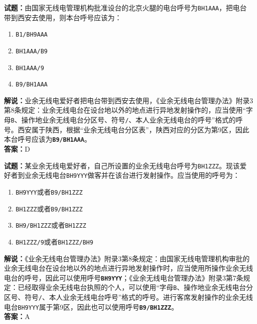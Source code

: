 \documentclass{ctexbook}
\begin{document}
\vspace{\baselineskip}

\noindent\textbf{试题：}由国家无线电管理机构批准设台的北京火腿的电台呼号为\texttt{BH1AAA}，把电台带到西安去使用，则本台呼号应该为：
\begin{enumerate}[leftmargin=3em]
  \item \texttt{B1/BH9AAA}
  \item \texttt{BH1AAA/B9}
  \item \texttt{BH1AAA/9}
  \item \texttt{B9/BH1AAA}
\end{enumerate}
\noindent\textbf{解说：}业余无线电爱好者把电台带到西安去使用，《业余无线电台管理办法》附录3第8条规定：业余无线电台在设台地以外的地点进行异地发射操作的，应当使用“字母\texttt{B}、操作地业余无线电台分区号、符号\texttt{/}、本人业余无线电台的呼号”格式的呼号。西安属于陕西，根据“业余无线电台分区表”，陕西对应的分区为第9区，因此本台呼号应该为\texttt{\textbf{B9/BH1AAA}}。\\\noindent\textbf{答案：}D

\vspace{\baselineskip}

\noindent\textbf{试题：}某业余无线电爱好者，自己所设置的业余无线电台呼号为\texttt{BH1ZZZ}。现该爱好者到业余无线电台\texttt{BH9YYY}做客并在该台进行发射操作。应当使用的呼号为：
\begin{enumerate}[leftmargin=3em]
  \item \texttt{BH9YYY}或者\texttt{B9/BH1ZZZ}
  \item \texttt{BH1ZZZ}或者\texttt{B9/BH1ZZZ}
  \item \texttt{BH9/BH1ZZZ}或者\texttt{BH1ZZZ}
  \item \texttt{BH1ZZZ/9}或者\texttt{BH1ZZZ/BH9}
\end{enumerate}
\noindent\textbf{解说：}《业余无线电台管理办法》附录3第8条规定：由国家无线电管理机构审批的业余无线电台在设台地以外的地点进行异地发射操作时，应当使用所操作业余无线电台的呼号，因此可以使用呼号\texttt{\textbf{BH9YYY}}；《业余无线电台管理办法》附录3第7条规定：已经取得业余无线电台执照的个人，可以使用“字母\texttt{B}、操作地业余无线电台分区号、符号\texttt{/}、本人业余无线电台呼号”格式的呼号。进行客席发射操作的业余无线电台\texttt{BH9YYY}属于第9区，因此也可以使用呼号\texttt{\textbf{B9/BH1ZZZ}}。\\\noindent\textbf{答案：}A

\vspace{\baselineskip}
\end{document}
